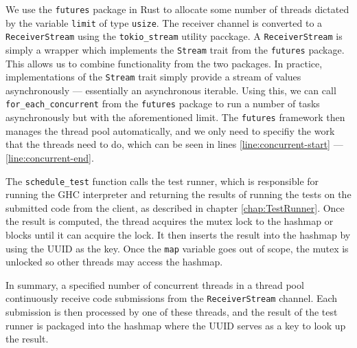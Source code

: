 We use the \texttt{futures} package in Rust to allocate some number of threads dictated by the variable \texttt{limit} of type \texttt{usize}.
The receiver channel is converted to a \texttt{ReceiverStream} using the \texttt{tokio\_stream} utility pacckage.
A \texttt{ReceiverStream} is simply a wrapper which implements the \texttt{Stream} trait from the \texttt{futures} package.
This allows us to combine functionality from the two packages.
In practice, implementations of the \texttt{Stream} trait simply provide a stream of values asynchronously --- essentially an asynchronous iterable.
Using this, we can call \texttt{for\_each\_concurrent} from the \texttt{futures} package to run a number of tasks asynchronously but with the aforementioned limit. 
The \texttt{futures} framework then manages the thread pool automatically, and we only need to specifiy the work that the threads need to do, which can be seen in lines \ref{line:concurrent-start} --- \ref{line:concurrent-end}.

The \texttt{schedule\_test} function calls the test runner, which is responsible for running the GHC interpreter and returning the results of running the tests on the submitted code from the client, as described in chapter \ref{chap:TestRunner}.
Once the result is computed, the thread acquires the mutex lock to the hashmap or blocks until it can acquire the lock.
It then inserts the result into the hashmap by using the UUID as the key.
Once the \texttt{map} variable goes out of scope, the mutex is unlocked so other threads may access the hashmap.

In summary, a specified number of concurrent threads in a thread pool continuously receive code submissions from the \texttt{ReceiverStream} channel.
Each submission is then processed by one of these threads, and the result of the test runner is packaged into the hashmap where the UUID serves as a key to look up the result.